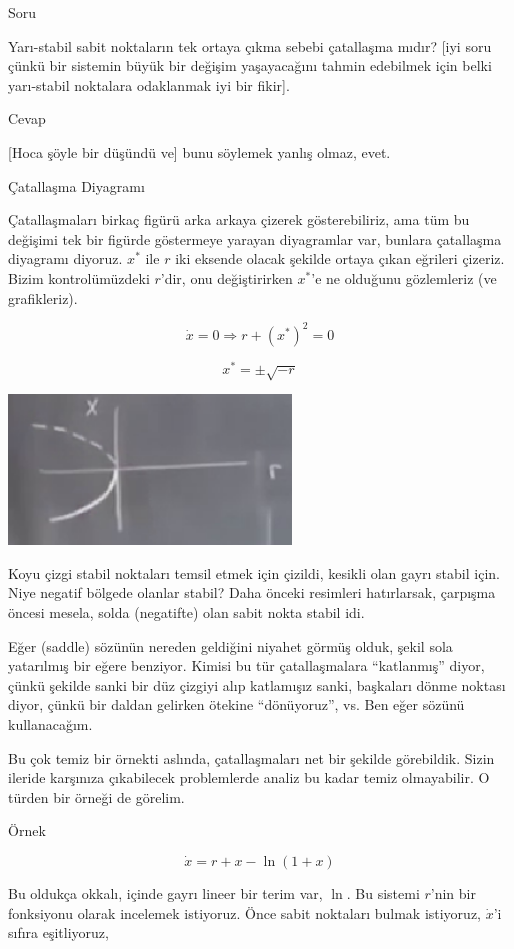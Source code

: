 \documentclass[12pt,fleqn]{article}\usepackage{../../common}
\begin{document}
Soru

Yarı-stabil sabit noktaların tek ortaya çıkma sebebi çatallaşma mıdır? [iyi soru
çünkü bir sistemin büyük bir değişim yaşayacağını tahmin edebilmek için belki
yarı-stabil noktalara odaklanmak iyi bir fikir].

Cevap

[Hoca şöyle bir düşündü ve] bunu söylemek yanlış olmaz, evet.

Çatallaşma Diyagramı

Çatallaşmaları birkaç figürü arka arkaya çizerek gösterebiliriz, ama tüm bu
değişimi tek bir figürde göstermeye yarayan diyagramlar var, bunlara çatallaşma
diyagramı diyoruz. $x^*$ ile $r$ iki eksende olacak şekilde ortaya çıkan
eğrileri çizeriz. Bizim kontrolümüzdeki $r$'dir, onu değiştirirken $x^*$'e ne
olduğunu gözlemleriz (ve grafikleriz).

$$ \dot{x}=0 \Rightarrow r + (x^*)^2 = 0  $$

$$ x^* = \pm \sqrt{-r} $$

\includegraphics[height=4cm]{02_14.png}

Koyu çizgi stabil noktaları temsil etmek için çizildi, kesikli olan gayrı stabil
için. Niye negatif bölgede olanlar stabil? Daha önceki resimleri hatırlarsak,
çarpışma öncesi mesela, solda (negatifte) olan sabit nokta stabil idi.

Eğer (saddle) sözünün nereden geldiğini niyahet görmüş olduk, şekil sola
yatarılmış bir eğere benziyor. Kimisi bu tür çatallaşmalara ``katlanmış'' diyor,
çünkü şekilde sanki bir düz çizgiyi alıp katlamışız sanki, başkaları dönme
noktası diyor, çünkü bir daldan gelirken ötekine ``dönüyoruz'', vs. Ben eğer
sözünü kullanacağım.

Bu çok temiz bir örnekti aslında, çatallaşmaları net bir şekilde
görebildik. Sizin ileride karşınıza çıkabilecek problemlerde analiz bu kadar
temiz olmayabilir. O türden bir örneği de görelim.

Örnek

$$ \dot{x} = r + x - \ln(1+x) $$

Bu oldukça okkalı, içinde gayrı lineer bir terim var, $\ln$. Bu sistemi $r$'nin
bir fonksiyonu olarak incelemek istiyoruz. Önce sabit noktaları bulmak
istiyoruz, $\dot{x}$'i sıfıra eşitliyoruz,
\end{document}
